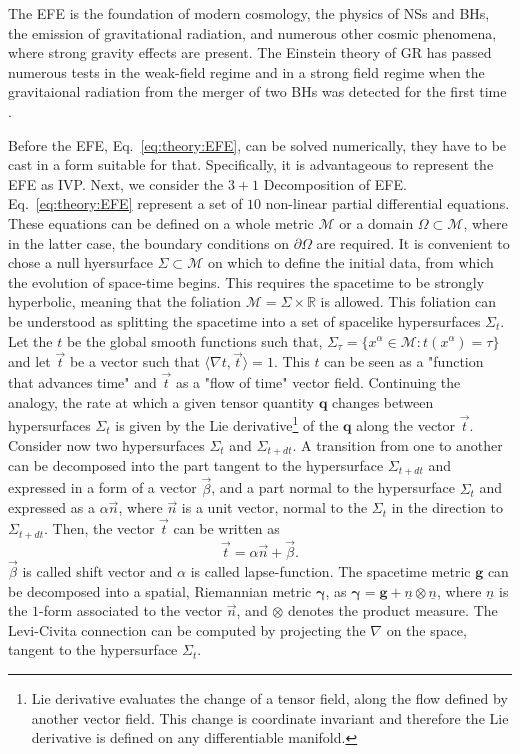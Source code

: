 The \ac{EFE} is the foundation of modern cosmology, the physics of \acp{NS} and \acp{BH},
the emission of gravitational radiation, and numerous other cosmic phenomena, 
where strong gravity effects are present. The Einstein theory of \ac{GR} has 
passed numerous tests in the weak-field regime \citep{Asmodelle:2017sxn} and in a 
strong field regime when the gravitaional radiation from the merger of two \acp{BH} was 
detected for the first time \citep{Abbott:2016blz}.

Before the \ac{EFE}, Eq.~\eqref{eq:theory:EFE}, can be solved numerically, they have to 
be cast in a form suitable for that. Specifically, it is advantageous to represent 
the \ac{EFE} as \ac{IVP}. Next, we consider the $3+1$ Decomposition of \ac{EFE}. 
%
Eq.~\eqref{eq:theory:EFE} represent a set of $10$ non-linear partial differential equations. 
These equations can be defined on a whole metric $\mathcal{M}$ or a domain $\Omega\subset\mathcal{M}$,
where in the latter case, the boundary conditions on $\partial\Omega$ are required. 
%
It is convenient to chose a null hyersurface $\Sigma\subset\mathcal{M}$ on which to define the initial data, 
from which the evolution of space-time begins. This requires the spacetime to be strongly hyperbolic, 
meaning that the foliation $\mathcal{M}=\Sigma\times\mathbb{R}$ is allowed. 
This foliation can be understood as splitting the spacetime into a set of spacelike hypersurfaces $\Sigma_t$. 
%
Let the $t$ be the global smooth functions such that, 
$\Sigma_{\tau} = \{x^{\alpha}\in\mathcal{M}: t(x^{\alpha})=\tau\}$ 
and let $\vec{t}$ be a vector such that $\langle\nabla t, \vec{t}\rangle = 1$. 
This $t$ can be seen as a "function that advances time" and $\vec{t}$ as a "flow of time" vector field. 
Continuing the analogy, the rate at which a given tensor quantity $\boldsymbol{q}$ changes 
between hypersurfaces $\Sigma_t$ is given by the Lie derivative\footnote{
    Lie derivative evaluates the change of a tensor field, along the flow 
    defined by another vector field. This change is coordinate invariant 
    and therefore the Lie derivative is defined on any differentiable manifold.
} of the $\boldsymbol{q}$ along the vector $\vec{t}$.
%
Consider now two hypersurfaces $\Sigma_t$ and $\Sigma_{t+dt}$. 
A transition from one to another can be decomposed into the part tangent to the hypersurface 
$\Sigma_{t+dt}$ and expressed in a form of a vector $\vec{\beta}$, and a part normal to the hypersurface 
$\Sigma_t$ and expressed as a $\alpha \vec{n}$, where $\vec{n}$ is a unit vector, 
normal to the $\Sigma_t$ in the direction to $\Sigma_{t+dt}$. Then, the vector $\vec{t}$ can be written as 
%
\begin{equation*}
\vec{t} = \alpha\vec{n}+\vec{\beta}.
\end{equation*}
%
$\vec{\beta}$ is called shift vector and $\alpha$ is called lapse-function.
%
The spacetime metric $\boldsymbol{g}$ can be decomposed into a spatial, 
Riemannian metric $\boldsymbol{\gamma}$, as 
$\boldsymbol{\gamma} = \boldsymbol{g} + \underline{n} \otimes \underline{n} $, 
where $\underline{n}$ is the $1$-form associated to the vector $\vec{n}$, 
and $\otimes$ denotes the product measure.
%
The Levi-Civita connection can be computed by projecting the 
$\nabla$ on the space, tangent to the hypersurface $\Sigma_t$.

